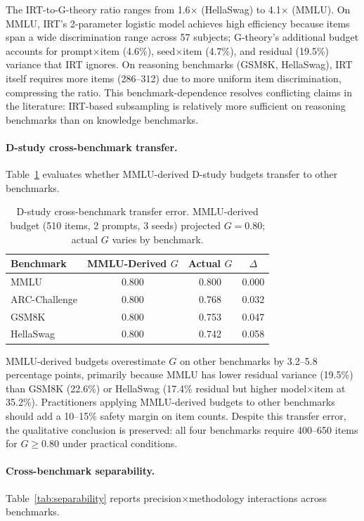 \documentclass[letterpaper]{article}
\begin{document}
The IRT-to-G-theory ratio ranges from 1.6$\times$ (HellaSwag) to 4.1$\times$ (MMLU).
On MMLU, IRT's 2-parameter logistic model achieves high efficiency because items span a wide discrimination range across 57 subjects; G-theory's additional budget accounts for prompt$\times$item (4.6\%), seed$\times$item (4.7\%), and residual (19.5\%) variance that IRT ignores.
On reasoning benchmarks (GSM8K, HellaSwag), IRT itself requires more items (286--312) due to more uniform item discrimination, compressing the ratio.
This benchmark-dependence resolves conflicting claims in the literature: IRT-based subsampling \citep{polo2024tinybenchmarks} is relatively more sufficient on reasoning benchmarks than on knowledge benchmarks.

\paragraph{D-study cross-benchmark transfer.}
Table~\ref{tab:d_study_transfer} evaluates whether MMLU-derived D-study budgets transfer to other benchmarks.

\begin{table}[t]
\centering
\caption{D-study cross-benchmark transfer error. MMLU-derived budget (510 items, 2 prompts, 3 seeds) projected $G = 0.80$; actual $G$ varies by benchmark.}
\label{tab:d_study_transfer}
\begin{tabular}{lccc}
\toprule
Benchmark & MMLU-Derived $G$ & Actual $G$ & $\Delta$ \\
\midrule
MMLU          & 0.800 & 0.800 & 0.000 \\
ARC-Challenge & 0.800 & 0.768 & 0.032 \\
GSM8K         & 0.800 & 0.753 & 0.047 \\
HellaSwag     & 0.800 & 0.742 & 0.058 \\
\bottomrule
\end{tabular}
\end{table}

MMLU-derived budgets overestimate $G$ on other benchmarks by 3.2--5.8 percentage points, primarily because MMLU has lower residual variance (19.5\%) than GSM8K (22.6\%) or HellaSwag (17.4\% residual but higher model$\times$item at 35.2\%).
Practitioners applying MMLU-derived budgets to other benchmarks should add a 10--15\% safety margin on item counts.
Despite this transfer error, the qualitative conclusion is preserved: all four benchmarks require 400--650 items for $G \geq 0.80$ under practical conditions.

\paragraph{Cross-benchmark separability.}
Table~\ref{tab:separability} reports precision$\times$methodology interactions across benchmarks.
\end{document}
